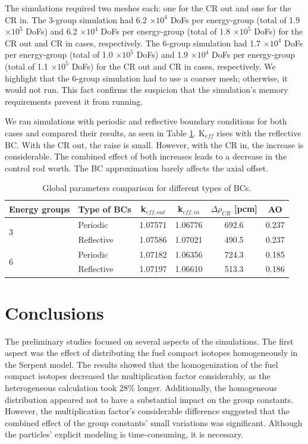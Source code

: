 The simulations required two meshes each: one for the CR out and one for the CR in.
The 3-group simulation had 6.2 $\times 10^4$ DoFs per energy-group (total of 1.9 $\times 10^5$ DoFs) and 6.2 $\times 10^4$ DoFs per energy-group (total of 1.8 $\times 10^5$ DoFs) for the CR out and CR in cases, respectively.
The 6-group simulation had 1.7 $\times 10^4$ DoFs per energy-group (total of 1.0 $\times 10^5$ DoFs) and 1.9 $\times 10^4$ DoFs per energy-group (total of 1.1 $\times 10^5$ DoFs) for the CR out and CR in cases, respectively.
We highlight that the 6-group simulation had to use a coarser mesh; otherwise, it would not run.
This fact confirms the suspicion that the simulation's memory requirements prevent it from running.

We ran simulations with periodic and reflective boundary conditions for both cases and compared their results, as seen in Table \ref{tab:benchmark-bc}.
K$_{eff}$ rises with the reflective BC.
With the CR out, the raise is small.
However, with the CR in, the increase is considerable.
The combined effect of both increases leads to a decrease in the control rod worth.
The BC approximation barely affects the axial offset.

\begin{table}[htbp!]
  \centering
  \caption{Global parameters comparison for different types of BCs.}
  \begin{tabular}{llcccc}
  \toprule
  Energy groups       & Type of BCs & k$_{eff, out}$ & k$_{eff, in}$ & $\Delta \rho_{CR}$ [pcm] & AO \\
  \midrule
  \multirow{2}{*}{3}  & Periodic     & 1.07571		& 1.06776		& 692.6		& 0.237		\\
                      & Reflective   & 1.07586	  & 1.07021   & 490.5		& 0.237	  \\ \hline
  \multirow{2}{*}{6}  & Periodic     & 1.07182		& 1.06356		& 724.3	  & 0.185  	\\
                      & Reflective   & 1.07197   	& 1.06610 	& 513.3		& 0.186		\\  
  \bottomrule
  \end{tabular}
  \label{tab:benchmark-bc}
\end{table}

\section{Conclusions}
\label{sec:neutr-conc}

The preliminary studies focused on several aspects of the simulations.
The first aspect was the effect of distributing the fuel compact isotopes homogeneously in the Serpent model.
The results showed that the homogenization of the fuel compact isotopes decreased the multiplication factor considerably, as the heterogeneous calculation took 28$\%$ longer.
Additionally, the homogeneous distribution appeared not to have a substantial impact on the group constants.
However, the multiplication factor's considerable difference suggested that the combined effect of the group constants’ small variations was significant.
Although the particles’ explicit modeling is time-consuming, it is necessary.

